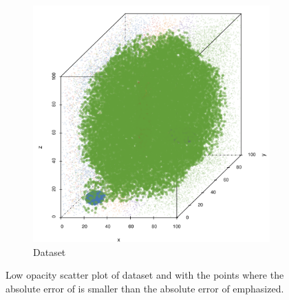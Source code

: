\begin{figure}
\begin{subfigure}{0.23\textwidth}
			\includegraphics[keepaspectratio=true, width=\textwidth, height=0.23\textheight]{discussion/img/baakman_3_abs_error_mbeSmallerThansambe}
			\caption{Dataset \baakmanThree}
			\label{fig:discussion:multisphere:mbeLowerError:baakman3}
		\end{subfigure}	
		\caption{Low opacity scatter plot of dataset 			 %
			\ferdosiTwo and  \baakmanTwo with the points where the absolute error of \mbe is smaller than the absolute error of \sambe emphasized.
		}
		\label{fig:discussion:multisphere:four:mbeLowerError}
	\end{figure}	